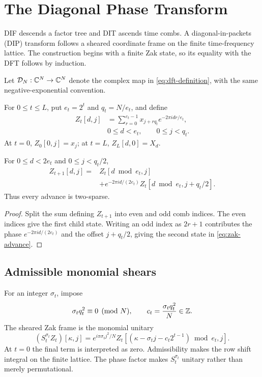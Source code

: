 \section{The Diagonal Phase Transform}
\label{sec:dip}

DIF descends a factor tree and DIT ascends time combs.  A diagonal-in-packets
(DIP) transform follows a sheared coordinate frame on the finite
time-frequency lattice.  The construction begins with a finite Zak state, so
its equality with the DFT follows by induction.

Let $\mathcal{D}_N:\mathbb{C}^N\to\mathbb{C}^N$ denote the complex map in
\eqref{eq:dft-definition}, with the same negative-exponential convention.

For $0\le t\le L$, put $e_t=2^t$ and $q_t=N/e_t$, and define
\begin{equation}
\begin{aligned}
 Z_t[d,j]&=\sum_{r=0}^{e_t-1}x_{j+rq_t}e^{-2\pi i dr/e_t},\\
 &0\le d<e_t,\qquad0\le j<q_t.
\end{aligned}
 \label{eq:zak-state}
\end{equation}
At $t=0$, $Z_0[0,j]=x_j$; at $t=L$, $Z_L[d,0]=X_d$.

\begin{lemma}
For $0\le d<2e_t$ and $0\le j<q_t/2$,
\begin{equation}
\begin{aligned}
 Z_{t+1}[d,j]={}&Z_t[d\bmod e_t,j]\\
 &+e^{-2\pi i d/(2e_t)}Z_t[d\bmod e_t,j+q_t/2].
\end{aligned}
 \label{eq:zak-advance}
\end{equation}
Thus every advance is two-sparse.
\end{lemma}
\begin{proof}
Split the sum defining $Z_{t+1}$ into even and odd comb indices.  The even
indices give the first child state.  Writing an odd index as $2r+1$ contributes
the phase $e^{-2\pi id/(2e_t)}$ and the offset $j+q_t/2$, giving the second
state in \eqref{eq:zak-advance}.
\end{proof}

\subsection{Admissible monomial shears}

For an integer $\sigma_t$, impose
\begin{equation}
 \sigma_tq_t^2\equiv0\pmod N,
 \qquad c_t={\sigma_tq_t^2\over N}\in\mathbb{Z}.
 \label{eq:shear-admissibility}
\end{equation}
The sheared Zak frame is the monomial unitary
\begin{equation}
 (S_t^{\sigma_t}Z_t)[\kappa,j]
 =e^{i\pi\sigma_tj^2/N}
 Z_t[(\kappa-\sigma_tj-c_t2^{t-1})\bmod e_t,j].
 \label{eq:monomial-shear}
\end{equation}
At $t=0$ the final term is interpreted as zero.  Admissibility makes the row
shift integral on the finite lattice.  The phase factor makes $S_t^{\sigma_t}$
unitary rather than merely permutational.

